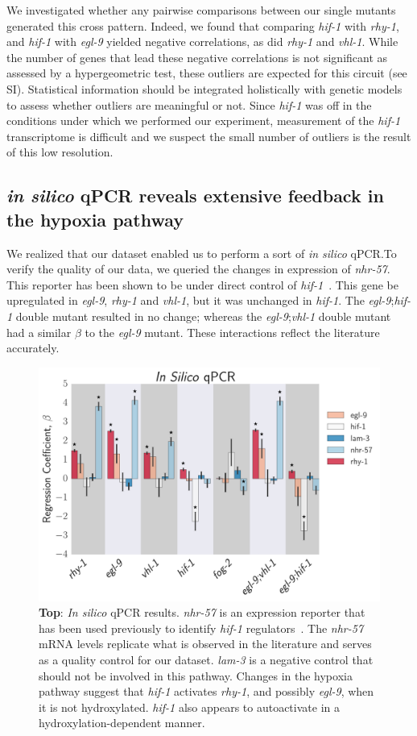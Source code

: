 \documentclass[9pt,twocolumn,twoside]{pnas-new}
\newcommand{\egl}{\emph{egl-9}}
\newcommand{\rhy}{\emph{rhy-1}}
\newcommand{\vhl}{\emph{vhl-1}}
\newcommand{\hif}{\emph{hif-1}}
\newcommand{\nhr}{\emph{nhr-57}}
\newcommand{\lam}{\emph{lam-3}}
\begin{document}
We investigated whether any pairwise comparisons between our single mutants generated this cross pattern. Indeed, we found that comparing \hif{} with \rhy{}, and \hif{} with \egl{} yielded negative correlations, as did \rhy{} and \vhl{}. While the number of genes that lead these negative correlations is not significant as assessed by a hypergeometric test, these outliers are expected for this circuit (see SI). Statistical information should be integrated holistically with genetic models to assess whether outliers are meaningful or not. Since \hif{} was off in the conditions under which we performed our experiment, measurement of the \hif{} transcriptome is difficult and we suspect the small number of outliers is the result of this low resolution.


\subsection{\emph{in silico} qPCR reveals extensive feedback in the hypoxia pathway}
\label{sub:qPCR}
We realized that our dataset enabled us to perform a sort of \emph{in silico} qPCR.\@ To verify the quality of our data, we queried the changes in expression of \nhr{}. This reporter has been shown to be under direct control of \hif{}~\cite{Shen2006,Shen2005,Ackerman2012,Park2012}. This gene be upregulated in \egl{}, \rhy{} and \vhl{}, but it was unchanged in \hif{}. The \egl{};\hif{} double mutant resulted in no change; whereas the \egl{};\vhl{} double mutant had a similar $\beta$ to the \egl{} mutant. These interactions reflect the literature accurately.

\begin{figure}[tbhp]
\centering
\includegraphics[width=\linewidth]{figs/qpcr.pdf}
\caption{\textbf{Top}: \emph{In silico} qPCR results. \nhr{} is an expression reporter that has been used previously to identify \hif{} regulators~\cite{Shen2006,Shao2009}. The \nhr{} mRNA levels replicate what is observed in the literature and serves as a quality control for our dataset. \lam{} is a negative control that should not be involved in this pathway. Changes in the hypoxia pathway suggest that \hif{} activates \rhy{}, and possibly \egl{}, when it is not hydroxylated. \hif{} also appears to autoactivate in a hydroxylation-dependent manner.}
\label{fig:qpcr}
\end{figure}
\end{document}
